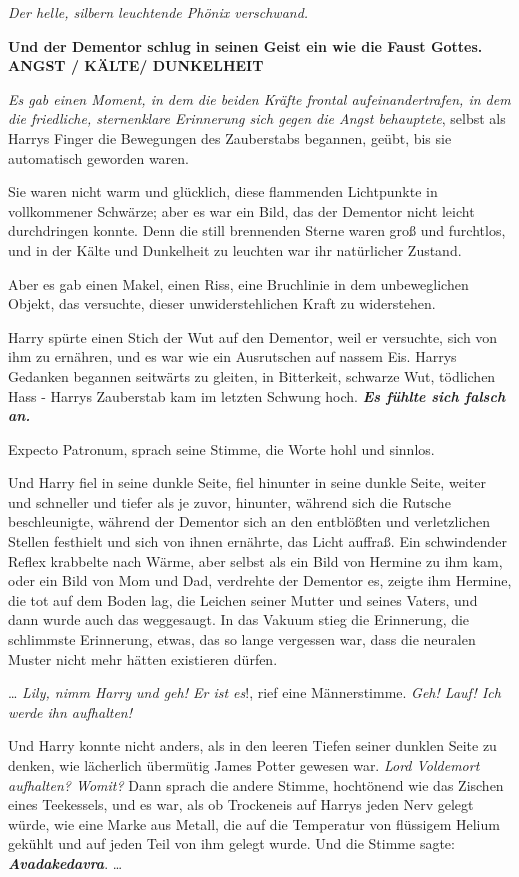 \emph{Der helle, silbern leuchtende Phönix verschwand.}

\textbf{Und der Dementor schlug in seinen Geist ein wie die Faust Gottes.}
\textbf{ANGST / KÄLTE/ DUNKELHEIT}

\emph{Es gab einen Moment, in dem die beiden Kräfte frontal aufeinandertrafen,
in dem die friedliche, sternenklare Erinnerung sich gegen die Angst behauptete},
selbst als Harrys Finger die Bewegungen des Zauberstabs begannen, geübt, bis sie
automatisch geworden waren.

Sie waren nicht warm und glücklich, diese flammenden Lichtpunkte in vollkommener
Schwärze; aber es war ein Bild, das der Dementor nicht leicht durchdringen
konnte. Denn die still brennenden Sterne waren groß und furchtlos, und in der
Kälte und Dunkelheit zu leuchten war ihr natürlicher Zustand.

Aber es gab einen Makel, einen Riss, eine Bruchlinie in dem unbeweglichen
Objekt, das versuchte, dieser unwiderstehlichen Kraft zu widerstehen.

Harry spürte einen Stich der Wut auf den Dementor, weil er versuchte, sich von
ihm zu ernähren, und es war wie ein Ausrutschen auf nassem Eis. Harrys Gedanken
begannen seitwärts zu gleiten, in Bitterkeit, schwarze Wut, tödlichen Hass -
Harrys Zauberstab kam im letzten Schwung hoch. \textbf{\emph{ Es fühlte sich
falsch an.}}

\glqq{}Expecto Patronum\grqq{}, sprach seine Stimme, die Worte hohl und sinnlos.

Und Harry fiel in seine dunkle Seite, fiel hinunter in seine dunkle Seite,
weiter und schneller und tiefer als je zuvor, hinunter, während sich die Rutsche
beschleunigte, während der Dementor sich an den entblößten und verletzlichen
Stellen festhielt und sich von ihnen ernährte, das Licht auffraß. Ein
schwindender Reflex krabbelte nach Wärme, aber selbst als ein Bild von Hermine
zu ihm kam, oder ein Bild von Mom und Dad, verdrehte der Dementor es, zeigte ihm
Hermine, die tot auf dem Boden lag, die Leichen seiner Mutter und seines Vaters,
und dann wurde auch das weggesaugt. In das Vakuum stieg die Erinnerung, die
schlimmste Erinnerung, etwas, das so lange vergessen war, dass die neuralen
Muster nicht mehr hätten existieren dürfen.

… \glqq{}\emph{Lily, nimm Harry und geh! Er ist es}!\grqq{}, rief eine
Männerstimme. \glqq{}\emph{Geh! Lauf! Ich werde ihn aufhalten!}\grqq{}

Und Harry konnte nicht anders, als in den leeren Tiefen seiner dunklen Seite zu
denken, wie lächerlich übermütig James Potter gewesen war. \emph{Lord Voldemort
aufhalten? Womit?} Dann sprach die andere Stimme, hochtönend wie das Zischen
eines Teekessels, und es war, als ob Trockeneis auf Harrys jeden Nerv gelegt
würde, wie eine Marke aus Metall, die auf die Temperatur von flüssigem Helium
gekühlt und auf jeden Teil von ihm gelegt wurde. Und die Stimme sagte: \glqq{}
\textbf{\emph{Avadakedavra}}.\grqq{} …

